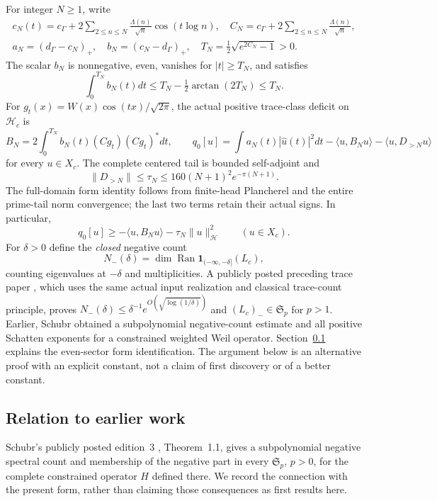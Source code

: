 \documentclass[11pt,a4paper]{article}
\numberwithin{equation}{section}
\theoremstyle{definition}\newtheorem{definition}[theorem]{Definition}
\theoremstyle{remark}\newtheorem{remark}[theorem]{Remark}
\newcommand{\Hh}{\mathcal H}\newcommand{\Hw}{\mathcal H}
\newcommand{\ip}[2]{\langle#1,#2\rangle}\newcommand{\norm}[1]{\lVert#1\rVert}\newcommand{\abs}[1]{\lvert#1\rvert}
\begin{document}
For integer $N\ge1$, write
\begin{gather*}
 c_N(t)=c_\Gamma+2\sum_{2\le n\le N}\frac{\Lambda(n)}{\sqrt n}\cos(t\log n),\quad
 C_N=c_\Gamma+2\sum_{2\le n\le N}\frac{\Lambda(n)}{\sqrt n},\\
 a_N=(d_\Gamma-c_N)_+,\quad b_N=(c_N-d_\Gamma)_+,\quad
 T_N=\tfrac12\sqrt{e^{2C_N}-1}>0.
\end{gather*}
The scalar $b_N$ is nonnegative, even, vanishes for $|t|\ge T_N$, and satisfies
\begin{equation}\label{vfourD:b-integral}
 \int_0^{T_N}b_N(t)dt\le T_N-\tfrac12\arctan(2T_N)\le T_N.
\end{equation}
For $g_t(x)=W(x)\cos(tx)/\sqrt{2\pi}$, the actual positive trace-class deficit on $\Hh_c$ is
\begin{equation}\label{vfourD:Bform}
 B_N=2\int_0^{T_N}b_N(t)(Cg_t)(Cg_t)^*dt,\qquad
 q_0[u]=\int a_N(t)|\widehat u(t)|^2dt-\ip u{B_Nu}-\ip u{D_{>N}u}
\end{equation}
for every $u\in X_c$. The complete centered tail is bounded self-adjoint and
\begin{equation}\label{vfourD:tail}
 \norm{D_{>N}}\le\tau_N\le160(N+1)^2e^{-\pi(N+1)}.
\end{equation}
The full-domain form identity follows from finite-head Plancherel and the entire prime-tail norm convergence; the last two terms retain their actual signs. In particular,
\begin{equation}\label{vfourD:lower}
 q_0[u]\ge-\ip u{B_Nu}-\tau_N\norm u_{\Hh}^2\qquad(u\in X_c).
\end{equation}
For $\delta>0$ define the \emph{closed} negative count
\[N_-(\delta)=\dim\operatorname{Ran}\mathbf1_{(-\infty,-\delta]}(L_c),\]
counting eigenvalues at $-\delta$ and multiplicities. A publicly posted preceding trace paper \cite{vfourTrace}, which uses the same actual input realization and classical trace-count principle, proves $N_-(\delta)\le\delta^{-1}e^{O(\sqrt{\log(1/\delta)})}$ and $(L_c)_-\in\mathfrak S_p$ for $p>1$. Earlier, Schubr \cite[Theorem~1.1]{vfourSchubr} obtained a subpolynomial negative-count estimate and all positive Schatten exponents for a constrained weighted Weil operator. Section~\ref{vfourD:prior} explains the even-sector form identification. The argument below is an alternative proof with an explicit constant, not a claim of first discovery or of a better constant.

\subsection{Relation to earlier work}\label{vfourD:prior}
Schubr's publicly posted edition~3 \cite{vfourSchubr}, Theorem~1.1, gives a subpolynomial negative spectral count and membership of the negative part in every $\mathfrak S_p$, $p>0$, for the complete constrained operator $H$ defined there. We record the connection with the present form, rather than claiming those consequences as first results here.
\end{document}

